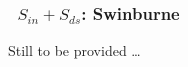 \vsssub
\subsubsection{~$S_{in} + S_{ds}$: Swinburne} \label{sec:ST6}
\vsssub


\noindent
Still to be provided \ldots
